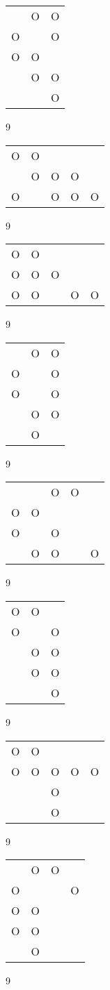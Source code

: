 \begin{tabular}{|m{0.2cm}m{0.2cm}m{0.2cm}|}\hline
 &O&O\\
O& &O\\
O&O& \\
 &O&O\\
 & &O\\
\hline\end{tabular}9
\begin{tabular}{|m{0.2cm}m{0.2cm}m{0.2cm}m{0.2cm}m{0.2cm}|}\hline
O&O& & & \\
 &O&O&O& \\
O& &O&O&O\\
\hline\end{tabular}9
\begin{tabular}{|m{0.2cm}m{0.2cm}m{0.2cm}m{0.2cm}m{0.2cm}|}\hline
O&O& & & \\
O&O&O& & \\
O&O& &O&O\\
\hline\end{tabular}9
\begin{tabular}{|m{0.2cm}m{0.2cm}m{0.2cm}|}\hline
 &O&O\\
O& &O\\
O& &O\\
 &O&O\\
 &O& \\
\hline\end{tabular}9
\begin{tabular}{|m{0.2cm}m{0.2cm}m{0.2cm}m{0.2cm}m{0.2cm}|}\hline
 & &O&O& \\
O&O& & & \\
O& &O& & \\
 &O&O& &O\\
\hline\end{tabular}9
\begin{tabular}{|m{0.2cm}m{0.2cm}m{0.2cm}|}\hline
O&O& \\
O& &O\\
 &O&O\\
 &O&O\\
 & &O\\
\hline\end{tabular}9
\begin{tabular}{|m{0.2cm}m{0.2cm}m{0.2cm}m{0.2cm}m{0.2cm}|}\hline
O&O& & & \\
O&O&O&O&O\\
 & &O& & \\
 & &O& & \\
\hline\end{tabular}9
\begin{tabular}{|m{0.2cm}m{0.2cm}m{0.2cm}m{0.2cm}|}\hline
 &O&O& \\
O& & &O\\
O&O& & \\
O&O& & \\
 &O& & \\
\hline\end{tabular}9
